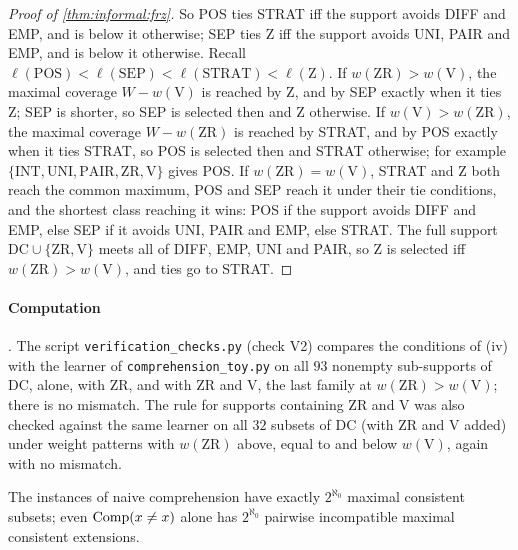 \begin{proof}[Proof of \cref{thm:informal:frz}]
So POS ties STRAT iff the support avoids DIFF and EMP, and is below it otherwise; SEP ties Z iff the support avoids UNI, PAIR and EMP, and is below it otherwise. Recall $\ell(\mathrm{POS})<\ell(\mathrm{SEP})<\ell(\mathrm{STRAT})<\ell(\mathrm Z)$. If $w(\mathrm{ZR})>w(\mathrm V)$, the maximal coverage $W-w(\mathrm V)$ is reached by Z, and by SEP exactly when it ties Z; SEP is shorter, so SEP is selected then and Z otherwise. If $w(\mathrm V)>w(\mathrm{ZR})$, the maximal coverage $W-w(\mathrm{ZR})$ is reached by STRAT, and by POS exactly when it ties STRAT, so POS is selected then and STRAT otherwise; for example $\{\mathrm{INT},\mathrm{UNI},\mathrm{PAIR},\mathrm{ZR},\mathrm V\}$ gives POS. If $w(\mathrm{ZR})=w(\mathrm V)$, STRAT and Z both reach the common maximum, POS and SEP reach it under their tie conditions, and the shortest class reaching it wins: POS if the support avoids DIFF and EMP, else SEP if it avoids UNI, PAIR and EMP, else STRAT. The full support $\mathrm{DC}\cup\{\mathrm{ZR},\mathrm V\}$ meets all of DIFF, EMP, UNI and PAIR, so Z is selected iff $w(\mathrm{ZR})>w(\mathrm V)$, and ties go to STRAT.
\end{proof}

\paragraph{Computation} . The script \texttt{verification\_checks.py} (check V2) compares the conditions of (iv) with the learner of \texttt{comprehension\_toy.py} on all $93$ nonempty sub-supports of DC, alone, with ZR, and with ZR and V, the last family at $w(\mathrm{ZR})>w(\mathrm V)$; there is no mismatch. The rule for supports containing ZR and V was also checked against the same learner on all $32$ subsets of DC (with ZR and V added) under weight patterns with $w(\mathrm{ZR})$ above, equal to and below $w(\mathrm V)$, again with no mismatch.

\begin{proposition}\label{prop:informal:continuum}
The instances of naive comprehension have exactly $2^{\aleph_0}$ maximal consistent subsets; even $\mathrm{Comp}(x\ne x)$ alone has $2^{\aleph_0}$ pairwise incompatible maximal consistent extensions.
\end{proposition}

